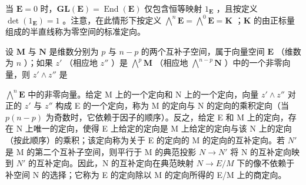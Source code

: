 当 \(\mathbf{E} = 0\) 时，\(\mathbf{GL}(\mathbf{E}) = \operatorname{End}(\mathbf{E})\) 仅包含恒等映射 \(1_{\mathbf{E}}\) ，且按定义 \(\det(1_{\mathbf{E}}) = 1\) 。注意，在此情形下按定义 \(\bigwedge^{n}\mathbf{E} = \bigwedge^{0}\mathbf{E} = \mathbf{K}\) ；\(\mathbf{K}\) 的由正标量组成的半直线称为零空间的标准定向。

设 \(\mathbf{M}\) 与 \(\mathbf{N}\) 是维数分别为 \(p\) 与 \(n - p\) 的两个互补子空间，属于向量空间 \(\mathbf{E}\) （维数为 \(n\) ）；如果 \(z'\) （相应地 \(z''\) ）是 \(\bigwedge^{p} \mathbf{M}\) （相应地 \(\bigwedge^{n - p} \mathbf{N}\) ）中的一个非零向量，则 \(z' \wedge z''\) 是

\(\bigwedge^{n} \mathbf{E}\) 中的非零向量。给定 M 上的一个定向和 N 上的一个定向，向量 \(z' \wedge z''\) 对正的 \(z'\) 与 \(z''\) 构成 E 的一个定向，称为 M 的定向与 N 的定向的乘积定向（当 \(p(n - p)\) 为奇数时，它依赖于因子的顺序）。反之，给定 E 和 M 上的定向，存在 N 上唯一的定向，使得 E 上给定的定向是 M 上给定的定向与该 N 上的定向（按此顺序）的乘积；该定向称为关于 E 的定向的 M 的定向的互补定向。若 \(N'\) 是 M 的第二个互补子空间，则平行于 M 的典范投影 \(N \to N'\) 将 N 的互补定向映到 \(N'\) 的互补定向。因此，N 的互补定向在典范映射 \(N \to E/M\) 下的像不依赖于补空间 N 的选择；它称为 E 的定向除以 M 的定向所得的 E/M 上的商定向。

